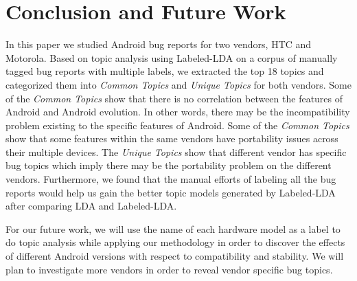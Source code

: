 \documentclass[10pt, conference, compsocconf]{IEEEtran}
\begin{document}
\section{Conclusion and Future Work}
\label{sec:conclusions}
In this paper we studied Android bug reports for two vendors, HTC and Motorola. Based on topic analysis using Labeled-LDA on a corpus of manually tagged bug reports with multiple labels, we extracted the top 18 topics and categorized them into \textit{Common Topics} and \textit{Unique Topics} for both vendors. Some of the \textit{Common Topics} show that there is no correlation between the features of Android and Android evolution. In other words, there may be the incompatibility problem existing to the specific features of Android. Some of the \textit{Common Topics} show that some features within the same vendors have portability issues across their multiple devices. The \textit{Unique Topics} show that different vendor has specific bug topics which imply there may be the portability problem on the different vendors. Furthermore, we found that the manual efforts of labeling all the bug reports would help us gain the better topic models generated by Labeled-LDA after comparing LDA and Labeled-LDA.

For our future work, we will use the name of each hardware model as a label to do topic analysis while applying our methodology in order to discover the effects of different Android versions with respect to compatibility and stability. We will plan to investigate more vendors in order to reveal vendor specific bug topics.

\end{document}

